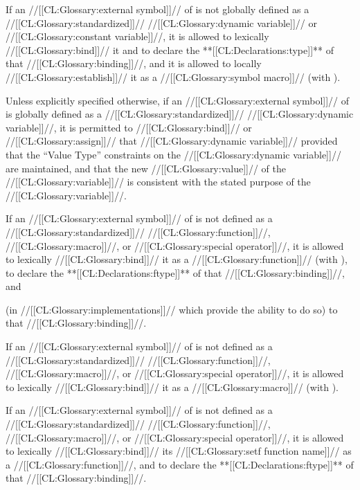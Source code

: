 If an //[[CL:Glossary:external symbol]]// of 
is not globally defined as a //[[CL:Glossary:standardized]]// //[[CL:Glossary:dynamic variable]]// 
					      or //[[CL:Glossary:constant variable]]//,
it is allowed to lexically //[[CL:Glossary:bind]]// it 
          and to declare the **[[CL:Declarations:type]]** of that //[[CL:Glossary:binding]]//, 
and
it is allowed to locally //[[CL:Glossary:establish]]// it as a //[[CL:Glossary:symbol macro]]// 
(\eg with ).




Unless explicitly specified otherwise,
if an //[[CL:Glossary:external symbol]]// of  
is globally defined as a //[[CL:Glossary:standardized]]// //[[CL:Glossary:dynamic variable]]//,
it is permitted to //[[CL:Glossary:bind]]// or //[[CL:Glossary:assign]]// that //[[CL:Glossary:dynamic variable]]//
provided that the ``Value Type'' constraints on the //[[CL:Glossary:dynamic variable]]// 
are maintained, and that the new //[[CL:Glossary:value]]// of the //[[CL:Glossary:variable]]// 
is consistent with the stated purpose of the //[[CL:Glossary:variable]]//.

If an //[[CL:Glossary:external symbol]]// of  is not defined
as a //[[CL:Glossary:standardized]]// //[[CL:Glossary:function]]//, //[[CL:Glossary:macro]]//, or //[[CL:Glossary:special operator]]//,
it is allowed to lexically //[[CL:Glossary:bind]]// it as a //[[CL:Glossary:function]]// (\eg with ),
              to declare the **[[CL:Declarations:ftype]]** of that //[[CL:Glossary:binding]]//, 
          and 


              (in //[[CL:Glossary:implementations]]// which provide the ability to do so)
	      to  that //[[CL:Glossary:binding]]//.

If an //[[CL:Glossary:external symbol]]// of  is not defined
as a //[[CL:Glossary:standardized]]// //[[CL:Glossary:function]]//, //[[CL:Glossary:macro]]//, or //[[CL:Glossary:special operator]]//,
it is allowed to lexically //[[CL:Glossary:bind]]// it as a //[[CL:Glossary:macro]]// (\eg with ).




If an //[[CL:Glossary:external symbol]]// of  is not defined 
as a //[[CL:Glossary:standardized]]// //[[CL:Glossary:function]]//, //[[CL:Glossary:macro]]//, or //[[CL:Glossary:special operator]]//,
it is allowed to lexically //[[CL:Glossary:bind]]// its //[[CL:Glossary:setf function name]]//
as a //[[CL:Glossary:function]]//,
and to declare the **[[CL:Declarations:ftype]]** of that //[[CL:Glossary:binding]]//.


